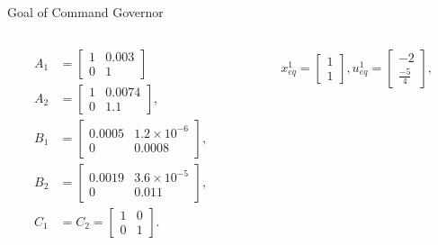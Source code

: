 \begin{slide}{Goal of Command Governor}
  \vspace*{\fill}
  \begin{columns}[T]
    \begin{column}{0.38\textwidth}
      \begin{equation}
        \begin{aligned}
          A_1 & =
          \begin{bmatrix}
            1 & 0.003 \\
            0 & 1
          \end{bmatrix}          \\
          A_2 & = \begin{bmatrix}
            1 & 0.0074 \\
            0 & 1.1
          \end{bmatrix}, \\
          B_1 & =
          \begin{bmatrix}
            0.0005 & 1.2\times{}10^{-6} \\
            0      & 0.0008
          \end{bmatrix},         \\
          B_2 & = \begin{bmatrix}
            0.0019 & 3.6\times{}10^{-5} \\
            0      & 0.011
          \end{bmatrix}, \\
          C_1 & = C_2 =
          \begin{bmatrix}
            1 & 0 \\
            0 & 1
          \end{bmatrix}.         \\
        \end{aligned}
      \end{equation}
    \end{column}%
    \hfill%
    \begin{column}{0.58\textwidth}
      \begin{equation}
        \begin{aligned}
          x_{eq}^1 = \begin{bmatrix}
            1 \\ 1
          \end{bmatrix},
          u_{eq}^1 = \begin{bmatrix}
            -2 \\ \frac{-5}{4}
          \end{bmatrix},

\end{aligned}
\end{equation}
\end{column}
\end{columns}
\end{slide}

